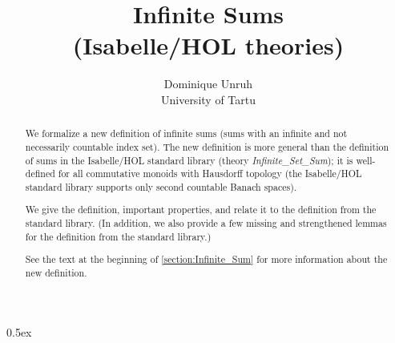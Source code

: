 \documentclass[11pt,a4paper]{article}
\begin{document}
\title{Infinite Sums\\[5pt]\normalsize (Isabelle/HOL theories)}
\author{Dominique Unruh\\\small University of Tartu}

\maketitle

\begin{abstract}
  We formalize a new definition of infinite sums (sums with an infinite and not necessarily countable index set).
  The new definition is more general than the definition of sums in the Isabelle/HOL standard library (theory \textit{Infinite\_Set\_Sum});
  it is well-defined for all commutative monoids with Hausdorff topology
  (the Isabelle/HOL standard library supports only second countable Banach spaces).

  We give the definition, important properties, and relate it to the definition from the standard library.
  (In addition, we also provide a few missing and strengthened lemmas for the definition from the standard library.)

  See the text at the beginning of \autoref{section:Infinite_Sum} for more information about the new definition.
\end{abstract}


\tableofcontents

\parindent 0pt\parskip 0.5ex





\end{document}
